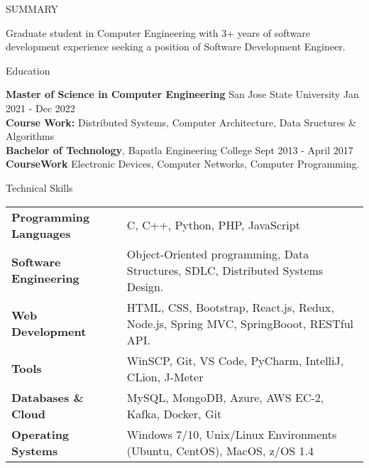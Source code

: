 \documentclass{resume} %
\begin{document}

\begin{rSection}{SUMMARY}

{Graduate student in Computer Engineering with 3+ years of software development experience seeking a position of Software Development Engineer.}


\end{rSection}
\vspace{-0.5em}
\begin{rSection}{Education}

{\bf Master of Science in Computer Engineering} {San Jose State University} \hfill {Jan 2021 - Dec 2022}\\
{\bf Course Work: }Distributed Systems, Computer Architecture, Data Sructures \& Algorithms\\
{\bf Bachelor of Technology}, Bapatla Engineering College \hfill {Sept 2013 - April 2017}\\
{\bf CourseWork} Electronic Devices, Computer Networks, Computer Programming.  
\end{rSection}

\vspace{-0.5em}
\begin{rSection}{Technical Skills}
\begin{tabular}{ @{} >{\bfseries}l @{\hspace{1ex}} l }
Programming Languages & C, C++, Python, PHP, JavaScript\\
Software Engineering & Object-Oriented programming, Data Structures, SDLC, Distributed Systems Design.\\
Web Development & HTML, CSS, Bootstrap, React.js, Redux, Node.js, Spring MVC, SpringBooot, RESTful API.\\
Tools & WinSCP,  Git, VS Code, PyCharm, IntelliJ, CLion, J-Meter\\
Databases \& Cloud  & MySQL, MongoDB, Azure, AWS EC-2, Kafka, Docker, Git\\
Operating Systems & Windows 7/10, Unix/Linux Environments (Ubuntu, CentOS), MacOS, z/OS 1.4
\end{tabular}
\end{rSection}
\end{document}

